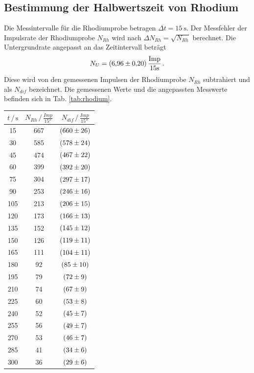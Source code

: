\subsection{Bestimmung der Halbwertszeit von Rhodium}
Die Messintervalle für die Rhodiumprobe betragen $\Delta t = \SI{15}{\second}$.
Der Messfehler der Impulsrate der Rhodiumprobe $N_{Rh}$ wird nach $\Delta N_{Rh} = \sqrt{N_{Rh}}$ berechnet.
Die Untergrundrate angepasst an das Zeitintervall beträgt
\begin{equation*}
    N_U = \SI{6.96+-0.20}{\frac{Imp}{15 \second}} \, .
\end{equation*}
Diese wird von den gemessenen Impulsen der Rhodiumprobe $N_{Rh}$ subtrahiert und als $N_{dif}$ bezeichnet.
Die gemessenen Werte und die angepassten Messwerte befinden sich in Tab. \ref{tab:rhodium}.
\begin{table}
    \centering
    \begin{tabular}{ccc|}
    \toprule
    $t \,/\, \si{\second}$ & $N_{Rh} \,/\, \si{\frac{Imp}{15 \second}}$ & $N_{dif} \,/\, \si{\frac{Imp}{15 \second}}$ \\
    \midrule
    15 & 667  & $\SI{660+-26}{}$ \\
    30 & 585  & $\SI{578+-24}{}$ \\	 
    45 & 474  & $\SI{467+-22}{}$ \\
    60 & 399  & $\SI{392+-20}{}$ \\
    75 & 304  & $\SI{297+-17}{}$ \\
    90 & 253  & $\SI{246+-16}{}$ \\
    105 & 213 & $\SI{206+-15}{}$ \\
    120 & 173 & $\SI{166+-13}{}$ \\
    135 & 152 & $\SI{145+-12}{}$ \\
    150 & 126 & $\SI{119+-11}{}$ \\
    165 & 111 & $\SI{104+-11}{}$ \\
    180 & 92  & $\SI{85+-10}{}$ \\
    195 & 79  & $\SI{72+-9}{}$ \\
    210 & 74  & $\SI{67+-9}{}$ \\
    225 & 60  & $\SI{53+-8}{}$ \\
    240 & 52  & $\SI{45+-7}{}$ \\
    255 & 56  & $\SI{49+-7}{}$ \\
    270 & 53  & $\SI{46+-7}{}$ \\
    285 & 41  & $\SI{34+-6}{}$ \\
    300 & 36  & $\SI{29+-6}{}$ \\

\end{tabular}
\end{table}
